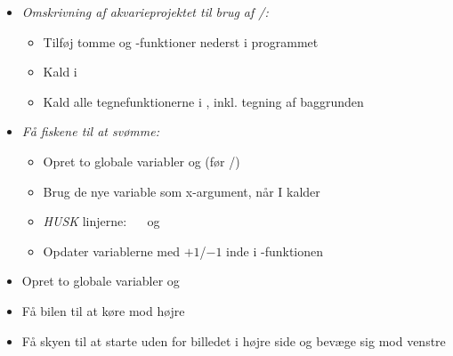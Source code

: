 \documentclass{ucph-handout}
\begin{document}
\begin{exercisebox}[adjusted title=Akvarie fortsat]
\begin{itemize}
\item \emph{Omskrivning af akvarieprojektet til brug af /:}
  \begin{itemize}
  \item Tilføj tomme  og -funktioner nederst i programmet
  \item Kald  i 
  \item Kald alle tegnefunktionerne i , inkl. tegning af baggrunden
  \end{itemize}
  
\item \emph{Få fiskene til at svømme:}
  \begin{itemize}
  \item Opret to globale variabler  og
     (før /)
  \item Brug de nye variable som x-argument, når I kalder 
  \item \emph{HUSK} linjerne: ~~ og ~~
  \item Opdater variablerne med $+1$/$-1$ inde i -funktionen
  \end{itemize}
\end{itemize}
\end{exercisebox}
\begin{exercisebox}[adjusted title=Green City fortsat]
\begin{itemize}
\item Opret to globale variabler  og 
\item Få bilen til at køre mod højre
\item Få skyen til at starte uden for billedet i højre side og bevæge sig mod venstre
\end{itemize}
\end{exercisebox}
\end{document}

